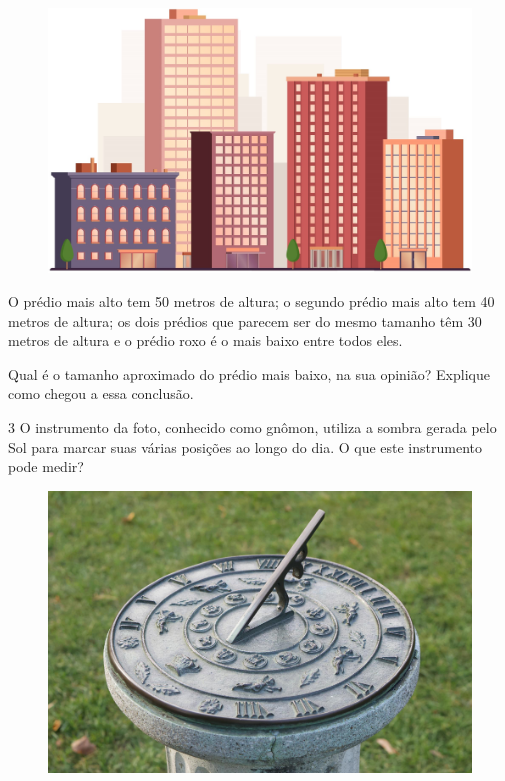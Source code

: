 \begin{figure}[htpb!]
\centering
\includegraphics[width=.6\textwidth]{./media/image31.png}
\end{figure}

O prédio mais alto tem 50 metros de altura; o segundo prédio mais alto
tem 40 metros de altura; os dois prédios que parecem ser do mesmo
tamanho têm 30 metros de altura e o prédio roxo é o mais baixo entre
todos eles.

Qual é o tamanho aproximado do prédio mais baixo, na sua opinião?
Explique como chegou a essa conclusão.


\num{3} O instrumento da foto, conhecido como gnômon, utiliza a sombra
gerada pelo Sol para marcar suas várias posições ao longo do dia. O
que este instrumento pode medir?


\begin{figure}[htpb!]
\centering
\includegraphics[width=.5\textwidth]{./media/image33.png}
\end{figure}


